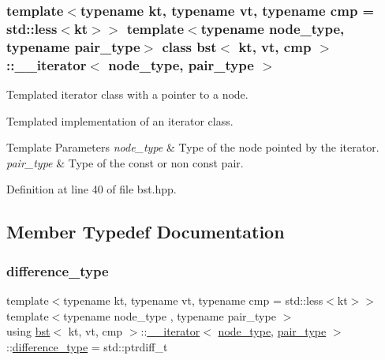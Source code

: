 \subsubsection*{template$<$typename kt, typename vt, typename cmp = std\+::less$<$kt$>$$>$\newline
template$<$typename node\+\_\+type, typename pair\+\_\+type$>$\newline
class bst$<$ kt, vt, cmp $>$\+::\+\_\+\+\_\+iterator$<$ node\+\_\+type, pair\+\_\+type $>$}

Templated iterator class with a pointer to a node. 

Templated implementation of an iterator class.


\begin{DoxyTemplParams}{Template Parameters}
{\em node\+\_\+type} & Type of the node pointed by the iterator. \\
\hline
{\em pair\+\_\+type} & Type of the const or non const pair. \\
\hline
\end{DoxyTemplParams}


Definition at line 40 of file bst.\+hpp.



\subsection{Member Typedef Documentation}
\mbox{\label{classbst_1_1____iterator_a4a4371f84bac8f8717fe4fdf57a9119d}} 
\subsubsection{\texorpdfstring{difference\+\_\+type}{difference\_type}}
{\footnotesize\ttfamily template$<$typename kt, typename vt, typename cmp = std\+::less$<$kt$>$$>$ \\
template$<$typename node\+\_\+type , typename pair\+\_\+type $>$ \\
using \hyperlink{classbst}{bst}$<$ kt, vt, cmp $>$\+::\hyperlink{classbst_1_1____iterator}{\+\_\+\+\_\+iterator}$<$ \hyperlink{classbst_a062eb2a1ac54802dbc4f0f74ae2afd01}{node\+\_\+type}, \hyperlink{classbst_a7b11cca2a3b4394915600194f741ab16}{pair\+\_\+type} $>$\+::\hyperlink{classbst_1_1____iterator_a4a4371f84bac8f8717fe4fdf57a9119d}{difference\+\_\+type} =  std\+::ptrdiff\+\_\+t}

